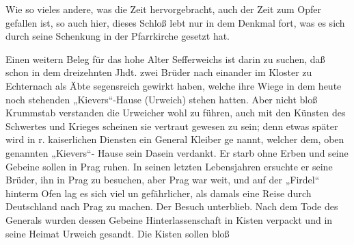 

Wie so vieles andere, was die Zeit hervorgebracht, auch der\ob
Zeit zum Opfer gefallen ist, so auch hier, dieses Schloß\ob
lebt nur in dem Denkmal fort, was es sich durch\ob
seine Schenkung in der Pfarrkirche gesetzt hat.

Einen weitern Beleg für das hohe\ob
{}%
Alter Sefferweichs ist darin zu suchen, daß schon \ob
in dem dreizehnten Jhdt. zwei Brüder nach einander\ob
im Kloster zu Echternach als Äbte segensreich\ob
gewirkt haben, welche ihre Wiege in dem heute\ob
noch stehenden „Kievers“-Hause (Urweich) stehen\ob
hatten. Aber nicht bloß Krummstab verstanden\ob
die Urweicher wohl zu führen, auch mit den Künsten\ob
des Schwertes und Krieges scheinen sie vertraut\ob
gewesen zu sein; denn etwas später wird in\ob
r.\ob
kaiserlichen Diensten ein General Kleiber ge\ohb
nannt, welcher dem, oben genannten „Kievers“-\ob
Hause sein Dasein verdankt. Er starb ohne Erben\ob
und seine Gebeine sollen in Prag ruhen. In seinen\ob
letzten Lebensjahren ersuchte er seine Brüder, ihn\ob
in Prag zu besuchen, aber Prag war weit, und\ob
auf der „Firdel“ hinterm Ofen lag es sich viel un\ohb
gefährlicher, als damals eine Reise durch Deutschland\ob
nach Prag zu machen. Der Besuch unterblieb.\ob
Nach dem Tode des Generals wurden dessen Gebeine \ob
Hinterlassenschaft in Kisten verpackt und in seine\ob
Heimat Urweich gesandt. Die Kisten sollen bloß
\pend
